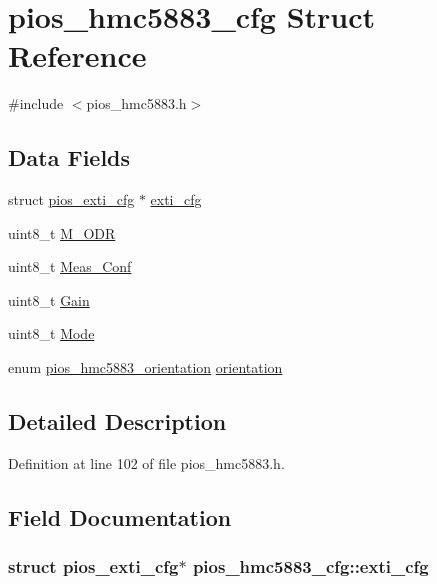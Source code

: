 \hypertarget{structpios__hmc5883__cfg}{\section{pios\-\_\-hmc5883\-\_\-cfg \-Struct \-Reference}
\label{structpios__hmc5883__cfg}
}


{\ttfamily \#include $<$pios\-\_\-hmc5883.\-h$>$}

\subsection*{\-Data \-Fields}
\begin{DoxyCompactItemize}
\item 
struct \hyperlink{structpios__exti__cfg}{pios\-\_\-exti\-\_\-cfg} $\ast$ \hyperlink{structpios__hmc5883__cfg_ac83cff150b246b7a8d768df5ab8e1407}{exti\-\_\-cfg}
\item 
uint8\-\_\-t \hyperlink{structpios__hmc5883__cfg_a236d1b5f3c3858bc2edd263841c37ace}{\-M\-\_\-\-O\-D\-R}
\item 
uint8\-\_\-t \hyperlink{structpios__hmc5883__cfg_ab04e80aeca39b18767e5e6cbe1f39654}{\-Meas\-\_\-\-Conf}
\item 
uint8\-\_\-t \hyperlink{structpios__hmc5883__cfg_a82fb6708784acace10b4f5c5a9c8e23e}{\-Gain}
\item 
uint8\-\_\-t \hyperlink{structpios__hmc5883__cfg_a0d50b5428ef5db686bdbd44127425f28}{\-Mode}
\item 
enum \hyperlink{group___p_i_o_s___h_m_c5883_ga9b5f48f8223effbfd7dbb15297957119}{pios\-\_\-hmc5883\-\_\-orientation} \hyperlink{structpios__hmc5883__cfg_ab8151b7d77ee14eb956089aa262c8de7}{orientation}
\end{DoxyCompactItemize}


\subsection{\-Detailed \-Description}


\-Definition at line 102 of file pios\-\_\-hmc5883.\-h.



\subsection{\-Field \-Documentation}
\hypertarget{structpios__hmc5883__cfg_ac83cff150b246b7a8d768df5ab8e1407}{
\subsubsection[{exti\-\_\-cfg}]{\setlength{\rightskip}{0pt plus 5cm}struct {\bf pios\-\_\-exti\-\_\-cfg}$\ast$ {\bf pios\-\_\-hmc5883\-\_\-cfg\-::exti\-\_\-cfg}}}\label{structpios__hmc5883__cfg_ac83cff150b246b7a8d768df5ab8e1407}


